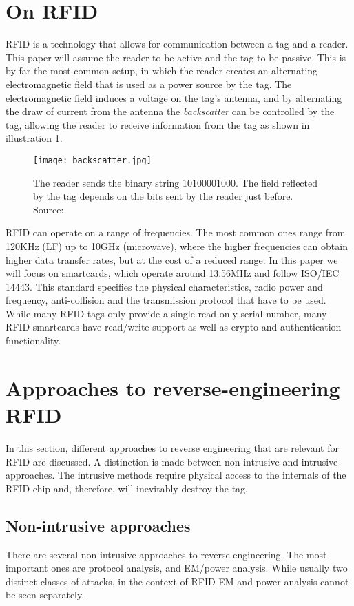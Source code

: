 \documentclass{llncs}
\begin{document}
\section{On RFID}
\label{sec:rfid}
RFID is a technology that allows for communication between a tag and a reader. This paper will assume the reader to be active and the tag to be passive. This is by far the most common setup, in which the reader creates an alternating electromagnetic field that is used as a power source by the tag. The electromagnetic field induces a voltage on the tag's antenna, and by alternating the draw of current from the antenna the \emph{backscatter} can be controlled by the tag, allowing the reader to receive information from the tag\cite{web:eetimes} as shown in illustration \ref{fig:backscatter}.

\begin{figure}[ht!]
\centering
\texttt{[image: backscatter.jpg]}
\caption{The reader sends the binary string 10100001000. The field reflected by the tag depends on the bits sent by the reader just before. Source: \cite{web:embedded}}
\label{fig:backscatter}
\end{figure}

RFID can operate on a range of frequencies. The most common ones range from 120KHz (LF) up to 10GHz (microwave), where the higher frequencies can obtain higher data transfer rates, but at the cost of a reduced range. In this paper we will focus on smartcards, which operate around 13.56MHz and follow ISO/IEC 14443\cite{doc:iso14443}. This standard specifies the physical characteristics, radio power and frequency, anti-collision and the transmission protocol that have to be used. While many RFID tags only provide a single read-only serial number, many RFID smartcards have read/write support as well as crypto and authentication functionality. 

\section{Approaches to reverse-engineering RFID}
\label{sec:approaches}
In this section, different approaches to reverse engineering that are relevant for RFID are discussed. A distinction is made between non-intrusive and intrusive approaches. The intrusive methods require physical access to the internals of the RFID chip and, therefore, will inevitably destroy the tag. 

\subsection{Non-intrusive approaches}
There are several non-intrusive approaches to reverse engineering. The most important ones are protocol analysis, and EM/power analysis. While usually two distinct classes of attacks, in the context of RFID EM and power analysis cannot be seen separately.
\end{document}
